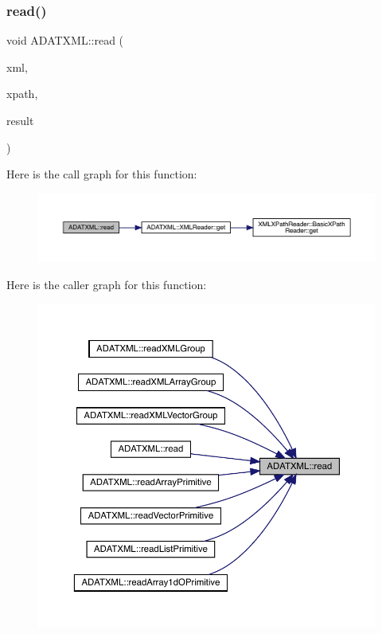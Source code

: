 \subsubsection{\texorpdfstring{read()}{read()}}
{\footnotesize\ttfamily void A\+D\+A\+T\+X\+M\+L\+::read (\begin{DoxyParamCaption}\item[{\mbox{\hyperlink{classADATXML_1_1XMLReader}{X\+M\+L\+Reader}} \&}]{xml,  }\item[{const std\+::string \&}]{xpath,  }\item[{string \&}]{result }\end{DoxyParamCaption})}

Here is the call graph for this function\+:\nopagebreak
\begin{figure}[H]
\begin{center}
\leavevmode
\includegraphics[width=350pt]{d7/da0/namespaceADATXML_a569ed4d03ded383a8aaf0ce90b7c80ba_cgraph}
\end{center}
\end{figure}
Here is the caller graph for this function\+:\nopagebreak
\begin{figure}[H]
\begin{center}
\leavevmode
\includegraphics[width=350pt]{d7/da0/namespaceADATXML_a569ed4d03ded383a8aaf0ce90b7c80ba_icgraph}
\end{center}
\end{figure}
\mbox{\label{namespaceADATXML_a0a1d6e8dcbf52e1413441824f0aa44e9}} 
